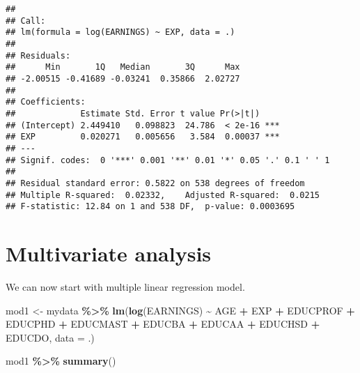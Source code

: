 \documentclass[
]{article}
\newenvironment{Shaded}{\begin{snugshade}}{\end{snugshade}}
\newcommand{\AttributeTok}[1]{\textcolor[rgb]{0.13,0.29,0.53}{#1}}
\newcommand{\FunctionTok}[1]{\textcolor[rgb]{0.13,0.29,0.53}{\textbf{#1}}}
\newcommand{\NormalTok}[1]{#1}
\newcommand{\OtherTok}[1]{\textcolor[rgb]{0.56,0.35,0.01}{#1}}
\newcommand{\SpecialCharTok}[1]{\textcolor[rgb]{0.81,0.36,0.00}{\textbf{#1}}}
\begin{document}
\begin{verbatim}
## 
## Call:
## lm(formula = log(EARNINGS) ~ EXP, data = .)
## 
## Residuals:
##      Min       1Q   Median       3Q      Max 
## -2.00515 -0.41689 -0.03241  0.35866  2.02727 
## 
## Coefficients:
##             Estimate Std. Error t value Pr(>|t|)    
## (Intercept) 2.449410   0.098823  24.786  < 2e-16 ***
## EXP         0.020271   0.005656   3.584  0.00037 ***
## ---
## Signif. codes:  0 '***' 0.001 '**' 0.01 '*' 0.05 '.' 0.1 ' ' 1
## 
## Residual standard error: 0.5822 on 538 degrees of freedom
## Multiple R-squared:  0.02332,    Adjusted R-squared:  0.0215 
## F-statistic: 12.84 on 1 and 538 DF,  p-value: 0.0003695
\end{verbatim}

\hypertarget{multivariate-analysis}{%
\section{Multivariate analysis}\label{multivariate-analysis}}

We can now start with multiple linear regression model.

\begin{Shaded}
\begin{Highlighting}[]
\NormalTok{mod1 }\OtherTok{\textless{}{-}}\NormalTok{ mydata }\SpecialCharTok{\%\textgreater{}\%}
  \FunctionTok{lm}\NormalTok{(}\FunctionTok{log}\NormalTok{(EARNINGS) }\SpecialCharTok{\textasciitilde{}}\NormalTok{ AGE }\SpecialCharTok{+}\NormalTok{ EXP }\SpecialCharTok{+} 
\NormalTok{       EDUCPROF }\SpecialCharTok{+}\NormalTok{ EDUCPHD }\SpecialCharTok{+} 
\NormalTok{       EDUCMAST }\SpecialCharTok{+}\NormalTok{ EDUCBA }\SpecialCharTok{+} 
\NormalTok{       EDUCAA }\SpecialCharTok{+}\NormalTok{ EDUCHSD }\SpecialCharTok{+} 
\NormalTok{       EDUCDO, }\AttributeTok{data =}\NormalTok{ .)}
  
\NormalTok{mod1 }\SpecialCharTok{\%\textgreater{}\%} \FunctionTok{summary}\NormalTok{()}
\end{Highlighting}
\end{Shaded}
\end{document}
